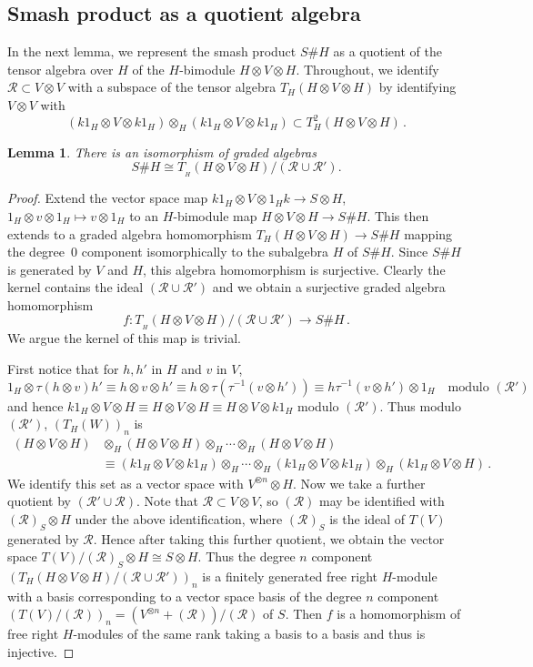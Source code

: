 \documentclass[11pt]{amsart}
\numberwithin{equation}{section}
\newtheorem{lemma}[equation]{Lemma}
\newcommand{\R}{\mathcal{R}}
\renewcommand{\_}[1]{\mbox{$_{\left( #1 \right)}$}}
\newcommand{\ot}{\otimes}
\newcommand{\Ho}{H}%
\begin{document}
{    %
\subsection*{Smash product as a quotient algebra}
In the next lemma, we represent the smash product $S\# \Ho$
as a quotient of the tensor algebra  over $H$ of
the $\Ho$-bimodule $\Ho\ot V\ot \Ho$.
Throughout, we identify $\R\subset V\ot V$ 
with a subspace of the tensor algebra $T_{H}(\Ho\ot V \ot \Ho)$
by identifying 
$V\ot V$ with
$$
(k1_H\ot V \ot k1_H)\ot_H (k1_H\ot V \ot k1_H)\subset
T^2_\Ho(\Ho\ot V\ot \Ho)
\, .
$$

\vspace{1ex}

\begin{lemma}
  \label{RewritingSmashProduct}
  There is an isomorphism of graded algebras
\[
  S\# \Ho \cong T_{\! _H}(\Ho\ot V\ot \Ho)/(\R\cup \R').
  \]
  \end{lemma}
  \begin{proof}
Extend the vector space map
  $k1_\Ho\ot V\ot 1_\Ho k\rightarrow S\ot H$,
  $1_\Ho\ot v\ot 1_\Ho\mapsto v\ot 1_H$
to an $H$-bimodule map
$H\ot V \ot H \rightarrow S\# H$.
This then extends to a graded algebra homomorphism
$T_{H}(H\ot V\ot H)\rightarrow S\# H$
mapping the degree~$0$ component
isomorphically to the subalgebra $H$ of $S\# H$.
Since $S\# H$ is generated by $V$ and $H$, this algebra
homomorphism is surjective.
Clearly the kernel contains the ideal $(\R\cup \R')$
and we obtain a surjective graded algebra homomorphism
$$
f: T_{\! _H}(H\ot V\ot H)/(\R\cup \R')
\rightarrow S\# H
\, .
$$
We argue the kernel of this map is trivial.

First notice that for $h,h'$ in $H$ and $v$ in $V$, 
$$
1_H\ot \tau(h\ot v)h'
\equiv
h\ot v \ot h'
\equiv
h\ot \tau(\tau^{-1}(v\ot h') )
\equiv
h\tau^{-1}(v\ot h') \ot 1_H 
\quad\text{modulo } (\R')
\, 
$$
and hence
$
k1_H\ot V \ot H
\equiv H\ot V\ot H
\equiv H\ot V \ot k1_H$
modulo $ (\R')$.
Thus modulo $(\R')$,
 $ (T_{H}(W))_n$ is
$$\begin{aligned}
  (H\ot V\ot H) & \ot_H (H\ot V\ot H)\ot_H 
 \cdots \ot_H(H\ot V\ot H) 
  \\  &\equiv
 (k1_H\ot V\ot k1_H) \ot_H   
\cdots\ot_H
(k1_H\ot V\ot k1_H) 
\ot_H (k1_H\ot V\ot H)
\, .
\end{aligned}
$$
We identify this set as a vector space with $V^{\ot n}\ot H$.
Now we take a further quotient by $(\R ' \cup \R)$.
Note that $\R\subset V\ot V$, so $(\R)$ may be identified with
$(\R)_S \ot H$ under the above identification, where 
$(\R)_S$ is the ideal of $T(V)$ generated by $\R$.
Hence after taking this further quotient, 
we obtain the vector space $T(V)/(\R)_S \ot H \cong S\ot H$.   
Thus the degree $n$ component 
$(T_H(H\ot V\ot H)/ (\R\cup\R'))_n$ is a finitely generated
free right $H$-module
with a basis corresponding to a vector space basis
of the degree $n$ component $(T(V)/(\R))_n=(V^{\ot n}+(\R))/(\R)$ of
$S$.
Then $f$ is a homomorphism of free right $H$-modules
of the same rank
taking a basis to a basis and thus is injective.
\end{proof}

}
\end{document}
